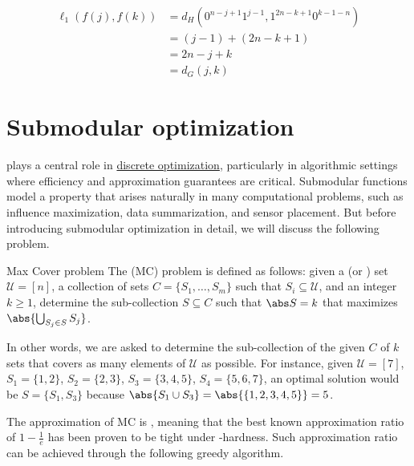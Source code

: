 \documentclass[a4paper, 12pt]{report}
\begin{document}
{\begin{itemize}
\begin{enumerate}
\begin{equation*}
\begin{split}
                                \ell_1(f(j), f(k)) &= d_H(0^{n - j + 1}1^{j - 1}, 1^{2n - k + 1}0^{k - 1- n}) \\
                                                   &= (j - 1) + (2n - k + 1) \\
                                                   &= 2n - j + k \\
                                                   &= d_G(j, k)
                            \end{split}
                        \end{equation*}
                \end{enumerate}
        \end{itemize}
    }

    \chapter{Submodular optimization}

     plays a central role in \href{https://en.wikipedia.org/wiki/Discrete_optimization}{discrete optimization}, particularly in algorithmic settings where efficiency and approximation guarantees are critical. Submodular functions model a  property that arises naturally in many computational problems, such as influence maximization, data summarization, and sensor placement. But before introducing submodular optimization in detail, we will discuss the following problem.

    \begin{frameddefn}{Max Cover problem}
        The  (MC) problem is defined as follows: given a  (or ) set $\mathcal U = [n]$, a collection of sets $C = \{S_1, \ldots, S_m \}$ such that $S_i \subseteq \mathcal U$, and an integer $k \ge 1$, determine the sub-collection $S \subseteq C$ such that $\abs S = k$ that maximizes $\abs{\bigcup_{S_j \in S}{S_j}}$.
    \end{frameddefn}

    In other words, we are asked to determine the sub-collection of the given $C$ of $k$ sets that covers as many elements of $\mathcal U$ as possible. For instance, given $\mathcal U = [7]$, $S_1 = \{1, 2\}$, $S_2 = \{2, 3\}$, $S_3 = \{3, 4, 5\}$, $S_4 = \{5, 6, 7\}$, an optimal solution would be $S = \{S_1, S_3\}$ because $\abs{S_1 \cup S_3} = \abs{\{1, 2, 3, 4, 5\}} = 5$.

    The approximation of MC is , meaning that the best known approximation ratio of $1 - \tfrac{1}{e}$ has been proven to be tight under \NPclass-hardness. Such approximation ratio can be achieved through the following greedy algorithm.
\end{document}
